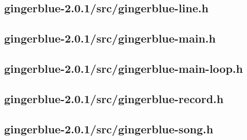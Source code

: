 \documentclass[UKenglish]{ifimaster}  %
\begin{document}
\begin{scriptsize}
  
  
  
\end{scriptsize}

\subsection{gingerblue-2.0.1/src/gingerblue-line.h}

\begin{scriptsize}
  
  
  
\end{scriptsize}

\subsection{gingerblue-2.0.1/src/gingerblue-main.h}

\begin{scriptsize}
  
  
  
\end{scriptsize}

\subsection{gingerblue-2.0.1/src/gingerblue-main-loop.h}

\begin{scriptsize}
  
  
  
\end{scriptsize}

\subsection{gingerblue-2.0.1/src/gingerblue-record.h}

\begin{scriptsize}
  
  
  
\end{scriptsize}

\subsection{gingerblue-2.0.1/src/gingerblue-song.h}
\end{document}
